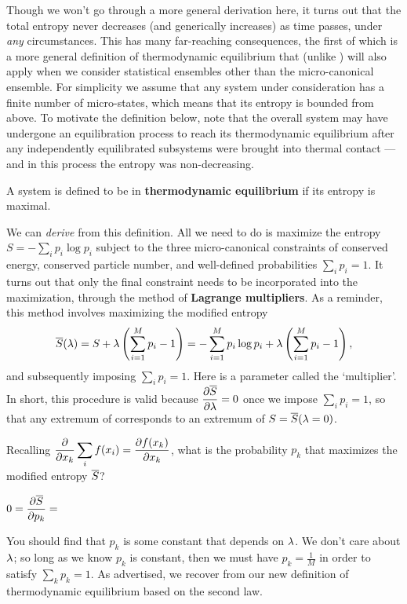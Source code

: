 Though we won't go through a more general derivation here, it turns out that the total entropy never decreases (and generically increases) as time passes, under \textit{any} circumstances.
This has many far-reaching consequences, the first of which is a more general definition of thermodynamic equilibrium that (unlike ) will also apply when we consider statistical ensembles other than the micro-canonical ensemble.
For simplicity we assume that any system under consideration has a finite number of micro-states, which means that its entropy is bounded from above.
To motivate the definition below, note that the overall system \Om may have undergone an equilibration process to reach its thermodynamic equilibrium after any independently equilibrated subsystems were brought into thermal contact --- and in this process the entropy was non-decreasing.

\begin{shaded} %
  \!A system is defined to be in \textbf{thermodynamic equilibrium} if its entropy is maximal.
\end{shaded}

We can \textit{derive}  from this definition.
All we need to do is maximize the entropy $S = - \sum_i p_i \log p_i$ subject to the three micro-canonical constraints of conserved energy, conserved particle number, and well-defined probabilities $\sum_i p_i = 1$.
It turns out that only the final constraint needs to be incorporated into the maximization, through the method of \textbf{Lagrange multipliers}.
As a reminder, this method involves maximizing the modified entropy
\begin{equation*}
  \overline S(\lambda) = S + \lambda\left(\sum_{i = 1}^M p_i - 1\right) = - \sum_{i = 1}^M p_i \log p_i + \lambda\left(\sum_{i = 1}^M p_i - 1\right),
\end{equation*}
and subsequently imposing $\sum_i p_i = 1$.
Here \la is a parameter called the `multiplier'.
In short, this procedure is valid because $\displaystyle \frac{\partial \overline S}{\partial \lambda} = 0$ once we impose $\sum_i p_i = 1$, so that any extremum of \Sbar corresponds to an extremum of $S = \overline S(\lambda = 0)$.

Recalling $\displaystyle \frac{\partial }{\partial x_k} \sum_i f(x_i) = \frac{\partial f(x_k)}{\partial x_k}$, what is the probability $p_k$ that maximizes the modified entropy $\overline S$?
\begin{mdframed}
  $\displaystyle 0 = \frac{\partial \overline S}{\partial p_k} = $ \\[100 pt]
\end{mdframed}
You should find that $p_k$ is some constant that depends on $\lambda$.
We don't care about $\lambda$; so long as we know $p_k$ is constant, then we must have $p_k = \frac{1}{M}$ in order to satisfy $\sum_k p_k = 1$.
As advertised, we recover  from our new definition of thermodynamic equilibrium based on the second law.



